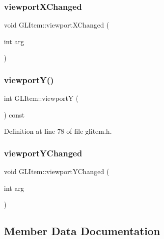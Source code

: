 \subsubsection{\texorpdfstring{viewportXChanged}{viewportXChanged}}
{\footnotesize\ttfamily void G\+L\+Item\+::viewport\+X\+Changed (\begin{DoxyParamCaption}\item[{int}]{arg }\end{DoxyParamCaption})\hspace{0.3cm}{\ttfamily [signal]}}

\mbox{\label{class_g_l_item_a890604fe40a634ca721a55494e69079a}} 
\subsubsection{\texorpdfstring{viewportY()}{viewportY()}}
{\footnotesize\ttfamily int G\+L\+Item\+::viewportY (\begin{DoxyParamCaption}{ }\end{DoxyParamCaption}) const\hspace{0.3cm}{\ttfamily [inline]}}



Definition at line 78 of file glitem.\+h.

\mbox{\label{class_g_l_item_ae652508d060e776d88285ca8a610d2fb}} 
\subsubsection{\texorpdfstring{viewportYChanged}{viewportYChanged}}
{\footnotesize\ttfamily void G\+L\+Item\+::viewport\+Y\+Changed (\begin{DoxyParamCaption}\item[{int}]{arg }\end{DoxyParamCaption})\hspace{0.3cm}{\ttfamily [signal]}}



\subsection{Member Data Documentation}
\mbox{\label{class_g_l_item_a077f0ece18caae8fa8a16ba36c51cac9}} 

